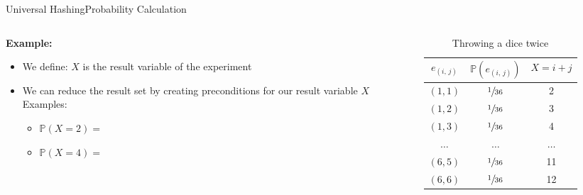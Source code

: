 \begin{frame}{Universal Hashing}{Probability Calculation}
  \begin{columns}
    \begin{column}{0.55\linewidth}
      \textbf{Example:}
      \begin{itemize}
        \item
          We define: $X$ is the result variable of the experiment
        \item
          We can reduce the result set by creating preconditions for our
          result variable $X$\\
          Examples:
          \begin{itemize}
            \item
              $\mathbb{P}(X = 2) = $
            \item
              $\mathbb{P}(X = 4) = $
          \end{itemize}
      \end{itemize}
    \end{column}
    \begin{column}{0.45\linewidth}
      \begin{table}[!h]
        \caption{Throwing a dice twice}
        \label{tab:probabilities_rolling_dice_twice2}
        \begin{tabularx}{0.95\linewidth}{c|cc}
          $e_{(i,\,j)}$ & $\mathbb{P}(e_{(i,\,j)})$ & $X = i + j$\\
          \midrule
          $(1, 1)$ & $\sfrac{1}{36}$ & 2\\
          $(1, 2)$ & $\sfrac{1}{36}$ & 3\\
          $(1, 3)$ & $\sfrac{1}{36}$ & 4\\
          $\dots$ & $\dots$ & $\dots$\\
          $(6, 5)$ & $\sfrac{1}{36}$ & 11\\
          $(6, 6)$ & $\sfrac{1}{36}$ & 12\\
        \end{tabularx}
      \end{table}
    \end{column}
  \end{columns}
\end{frame}


